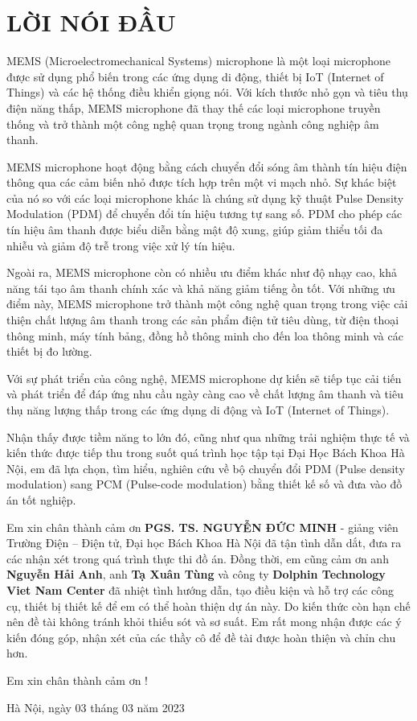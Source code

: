 \section*{LỜI NÓI ĐẦU}
\thispagestyle{empty}
MEMS (Microelectromechanical Systems) microphone là một loại microphone được sử dụng phổ biến trong các ứng dụng di động, thiết bị IoT (Internet of Things) và các hệ thống điều khiển giọng nói. Với kích thước nhỏ gọn và tiêu thụ điện năng thấp, MEMS microphone đã thay thế các loại microphone truyền thống và trở thành một công nghệ quan trọng trong ngành công nghiệp âm thanh.

MEMS microphone hoạt động bằng cách chuyển đổi sóng âm thành tín hiệu điện thông qua các cảm biến nhỏ được tích hợp trên một vi mạch nhỏ. Sự khác biệt của nó so với các loại microphone khác là chúng sử dụng kỹ thuật Pulse Density Modulation (PDM) để chuyển đổi tín hiệu tương tự sang số. PDM cho phép các tín hiệu âm thanh được biểu diễn bằng mật độ xung, giúp giảm thiểu tối đa nhiễu và giảm độ trễ trong việc xử lý tín hiệu.

Ngoài ra, MEMS microphone còn có nhiều ưu điểm khác như độ nhạy cao, khả năng tái tạo âm thanh chính xác và khả năng giảm tiếng ồn tốt. Với những ưu điểm này, MEMS microphone trở thành một công nghệ quan trọng trong việc cải thiện chất lượng âm thanh trong các sản phẩm điện tử tiêu dùng, từ điện thoại thông minh, máy tính bảng, đồng hồ thông minh cho đến loa thông minh và các thiết bị đo lường.

Với sự phát triển của công nghệ, MEMS microphone dự kiến sẽ tiếp tục cải tiến và phát triển để đáp ứng nhu cầu ngày càng cao về chất lượng âm thanh và tiêu thụ năng lượng thấp trong các ứng dụng di động và IoT (Internet of Things).

Nhận thấy được tiềm năng to lớn đó, cũng như qua những trải nghiệm thực tế và kiến thức được tiếp thu trong suốt quá trình học tập tại Đại Học Bách Khoa Hà Nội, em đã lựa chọn, tìm hiểu, nghiên cứu về bộ chuyển đổi PDM (Pulse density modulation) sang PCM (Pulse-code modulation) bằng thiết kế số và đưa vào đồ án tốt nghiệp.

Em xin chân thành cảm ơn  \textbf{PGS. TS. NGUYỄN ĐỨC MINH} - giảng viên Trường Điện –
Điện tử, Đại học Bách Khoa Hà Nội đã tận tình dẫn dắt, đưa ra 
các nhận xét trong quá trình thực thi đồ án. Đồng thời, em cũng cảm ơn anh \textbf{Nguyễn Hải Anh}, anh \textbf{Tạ Xuân Tùng} và công ty \textbf{Dolphin Technology Viet Nam Center} đã nhiệt tình hướng dẫn, tạo điều kiện và hỗ trợ các công cụ, thiết bị thiết kế để em có thể hoàn thiện dự án này. Do kiến thức còn hạn chế nên đề tài không tránh khỏi thiếu sót và sơ suất. Em rất mong nhận được các ý kiến đóng góp, nhận xét của các thầy cô để đề tài được hoàn thiện và chỉn chu hơn.

Em xin chân thành cảm ơn !

\hspace{7cm}Hà Nội, ngày 03 tháng 03 năm 2023

\newpage